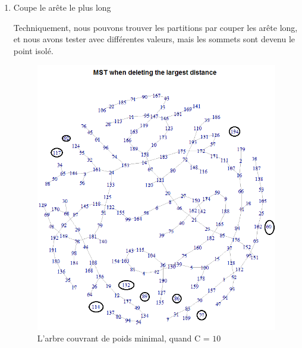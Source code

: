 \begin{enumerate}
  \item Coupe le arête le plus long
  
  Techniquement, nous pouvons trouver les partitions par couper les arête long, et nous avons tester avec différentes valeurs, mais les sommets sont devenu le point isolé.
  
  \begin{figure}[H]
\centering
\includegraphics[width=0.6\linewidth]{images/mst10}
\caption{L'arbre couvrant de poids minimal, quand C = $10$}
\label{fig:mst10}
\end{figure}

  \end{enumerate}










